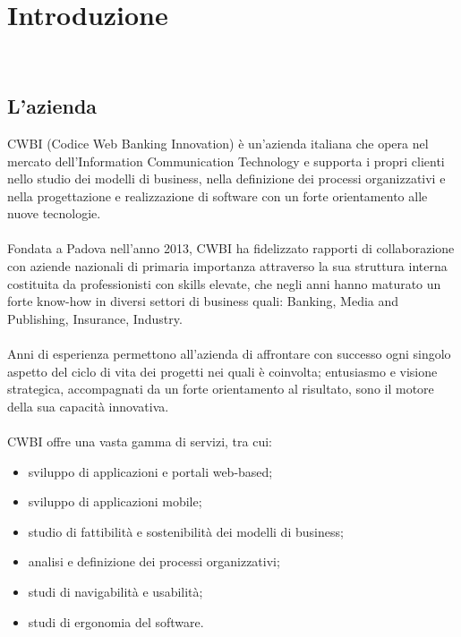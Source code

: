 \chapter{Introduzione}
\label{cap:introduzione}

\\

\section{L'azienda}

CWBI (Codice Web Banking Innovation) è un’azienda italiana che opera nel mercato dell'Information Communication Technology e supporta i propri clienti nello studio dei modelli di business, nella definizione dei processi organizzativi e nella progettazione e realizzazione di software con un forte orientamento alle nuove tecnologie.
\\
\\
Fondata a Padova nell'anno 2013, CWBI ha fidelizzato rapporti di collaborazione con aziende nazionali di primaria importanza attraverso la sua struttura interna costituita da professionisti con skills elevate, che negli anni hanno maturato un forte know-how in diversi settori di business quali: Banking, Media and Publishing, Insurance, Industry.
\\
\\
Anni di esperienza permettono all'azienda di affrontare con successo ogni singolo aspetto del ciclo di vita dei progetti nei quali è coinvolta; entusiasmo e visione strategica, accompagnati da un forte orientamento al risultato, sono il motore della sua capacità innovativa.
\\
\\
CWBI offre una vasta gamma di servizi, tra cui:
\begin{itemize}
\item sviluppo di applicazioni e portali web-based;
\item sviluppo di applicazioni mobile;
\item studio di fattibilità e sostenibilità dei modelli di business;
\item analisi e definizione dei processi organizzativi;
\item studi di navigabilità e usabilità;
\item studi di ergonomia del software.
\end{itemize}

